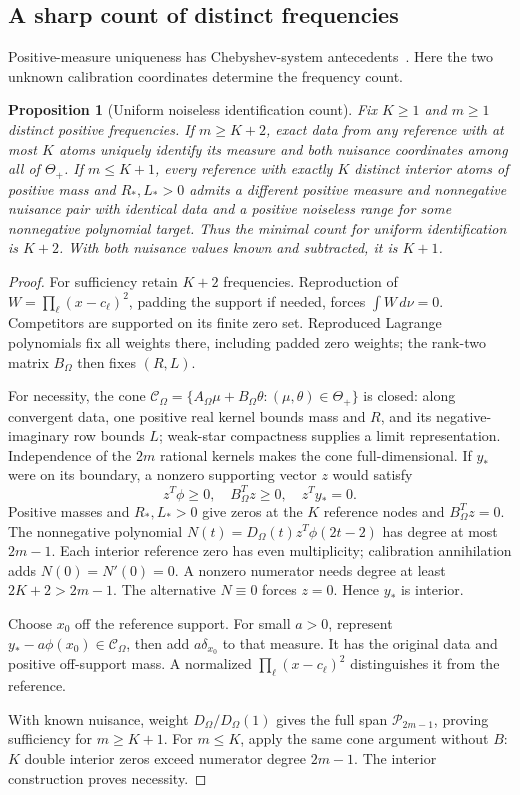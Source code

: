 \documentclass[10pt]{amsart}
\newtheorem{proposition}[theorem]{Proposition}
\theoremstyle{definition}
\theoremstyle{remark}
\newcommand{\ThetaAll}{\Theta_+}
\newcommand{\Pp}{\mathcal P}
\begin{document}
\subsection{A sharp count of distinct frequencies}\label{sec:frequencycount}
Positive-measure uniqueness has Chebyshev-system antecedents~\cite[Proposition~8]{eftekhari}. Here the two unknown calibration coordinates determine the frequency count.
\begin{proposition}[Uniform noiseless identification count]\label{prop:frequencycount}
Fix $K\ge1$ and $m\ge1$ distinct positive frequencies. If $m\ge K+2$, exact data from any reference with at most $K$ atoms uniquely identify its measure and both nuisance coordinates among all of $\ThetaAll$. If $m\le K+1$, every reference with exactly $K$ distinct interior atoms of positive mass and $R_*,L_*>0$ admits a different positive measure and nonnegative nuisance pair with identical data and a positive noiseless range for some nonnegative polynomial target. Thus the minimal count for uniform identification is $K+2$. With both nuisance values known and subtracted, it is $K+1$.
\end{proposition}
\begin{proof}
For sufficiency retain $K+2$ frequencies. Reproduction of $W=\prod_\ell(x-c_\ell)^2$, padding the support if needed, forces $\int W\,d\nu=0$. Competitors are supported on its finite zero set. Reproduced Lagrange polynomials fix all weights there, including padded zero weights; the rank-two matrix $B_\Omega$ then fixes $(R,L)$.

For necessity, the cone $\mathcal C_\Omega=\{A_\Omega\mu+B_\Omega\theta:(\mu,\theta)\in\ThetaAll\}$ is closed: along convergent data, one positive real kernel bounds mass and $R$, and its negative-imaginary row bounds $L$; weak-star compactness supplies a limit representation. Independence of the $2m$ rational kernels makes the cone full-dimensional. If $y_*$ were on its boundary, a nonzero supporting vector $z$ would satisfy
\[
 z^T\phi\ge0,\quad B_\Omega^Tz\ge0,\quad z^Ty_*=0.
\]
Positive masses and $R_*,L_*>0$ give zeros at the $K$ reference nodes and $B_\Omega^Tz=0$. The nonnegative polynomial $N(t)=D_\Omega(t)z^T\phi(2t-2)$ has degree at most $2m-1$. Each interior reference zero has even multiplicity; calibration annihilation adds $N(0)=N'(0)=0$. A nonzero numerator needs degree at least $2K+2>2m-1$. The alternative $N\equiv0$ forces $z=0$. Hence $y_*$ is interior.

Choose $x_0$ off the reference support. For small $a>0$, represent $y_*-a\phi(x_0)\in\mathcal C_\Omega$, then add $a\delta_{x_0}$ to that measure. It has the original data and positive off-support mass. A normalized $\prod_\ell(x-c_\ell)^2$ distinguishes it from the reference.

With known nuisance, weight $D_\Omega/D_\Omega(1)$ gives the full span $\Pp_{2m-1}$, proving sufficiency for $m\ge K+1$. For $m\le K$, apply the same cone argument without $B$: $K$ double interior zeros exceed numerator degree $2m-1$. The interior construction proves necessity.
\end{proof}
\end{document}
